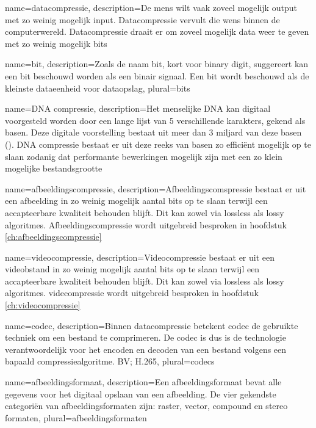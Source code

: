 {
	name={datacompressie},
	description={De mens wilt vaak zoveel mogelijk output met zo weinig mogelijk input. Datacompressie vervult die wens binnen de computerwereld. Datacompressie draait er om zoveel mogelijk data weer te geven met zo weinig mogelijk bits}
}

{
	name={bit},
	description={Zoals de naam bit, kort voor binary digit, suggereert kan een bit beschouwd worden als een binair signaal. Een bit wordt beschouwd als de kleinste dataeenheid voor dataopslag},
	plural={bits}
}

{
	name={DNA compressie},
	description={Het menselijke DNA kan digitaal voorgesteld worden door een lange lijst van 5 verschillende karakters, gekend als basen. Deze digitale voorstelling bestaat uit meer dan 3 miljard van deze basen (\cite{dodanaugent2011}). DNA compressie bestaat er uit deze reeks van basen zo efficiënt mogelijk op te slaan zodanig dat performante bewerkingen mogelijk zijn met een zo klein mogelijke bestandsgrootte}
}

{
	name={afbeeldingscompressie},
	description={Afbeeldingscomspressie bestaat er uit een afbeelding in zo weinig mogelijk aantal bits op te slaan terwijl een accapteerbare kwaliteit behouden blijft. Dit kan zowel via lossless als lossy algoritmes. Afbeeldingscompressie wordt uitgebreid besproken in hoofdstuk \ref{ch:afbeeldingscompressie}}
}

{
	name={videocompressie},
	description={Videocompressie bestaat er uit een videobstand in zo weinig mogelijk aantal bits op te slaan terwijl een accapteerbare kwaliteit behouden blijft. Dit kan zowel via lossless als lossy algoritmes. videcompressie wordt uitgebreid besproken in hoofdstuk \ref{ch:videocompressie}}
}

{
	name={codec},
	description={Binnen datacompressie betekent codec de gebruikte techniek om een bestand te comprimeren. De codec is dus is de technologie verantwoordelijk voor het encoden en decoden van een bestand volgens een bapaald compressiealgoritme. BV; H.265},
	plural={codecs}
}

{
	name={afbeeldingsformaat},
	description={Een afbeeldingsformaat bevat alle gegevens voor het digitaal opslaan van een afbeelding. De vier gekendste categoriën van afbeeldingsformaten zijn: raster, vector, compound en stereo formaten},
	plural={afbeeldingsformaten}
}

